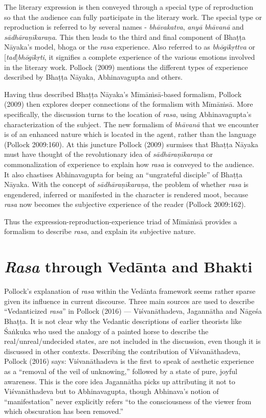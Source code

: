 \newpage

The literary expression is then conveyed through a special type of reproduction so that the audience can fully participate in the literary work. The special type or reproduction is referred to by several names - \textsl{bhāvakatva}, \textsl{anyā} \textsl{bhāvanā} and \textsl{sādhāraṇīkaraṇa}. This then leads to the third and final component of Bhaṭṭa Nāyaka’s model, bhoga or the \textsl{rasa} experience. Also referred to as \textsl{bhōgīkṛttva} or [\textsl{tad}]\textsl{bhōgīkṛti}, it signifies a complete experience of the various emotions involved in the literary work. Pollock (2009) mentions the different types of experience described by Bhaṭṭa Nāyaka, Abhinavagupta and others. 

Having thus described Bhaṭṭa Nāyaka’s Mīmāṁsā-based formalism, Pollock (2009) then explores deeper connections of the formalism with Mīmāṁsā. More specifically, the discussion turns to the location of \textsl{rasa}, using Abhinavagupta’s characterization of the subject. The new formalism of \textsl{bhāvanā} that we encounter is of an enhanced nature which is located in the agent, rather than the language (Pollock 2009:160). At this juncture Pollock (2009) surmises that Bhaṭṭa Nāyaka must have thought of the revolutionary idea of \textsl{sādhāraṇīkaraṇa} or commonalization of experience to explain how \textsl{rasa} is conveyed to the audience. It also chastises Abhinavagupta for being an “ungrateful disciple” of Bhaṭṭa Nāyaka. With the concept of \textsl{sādhāraṇīkaraṇa}, the problem of whether \textsl{rasa} is engendered, inferred or manifested in the character is rendered moot, because \textsl{rasa} now becomes the subjective experience of the reader (Pollock 2009:162).

Thus the expression-reproduction-experience triad of Mīmāṁsā provides a formalism to describe \textsl{rasa}, and explain its subjective nature.

\section*{\textsl{Rasa} through Vedānta and Bhakti}

Pollock’s explanation of \textsl{rasa} within the Vedānta framework seems rather sparse given its influence in current discourse. Three main sources are used to describe “Vedanticized \textsl{rasa}” in Pollock (2016) --- Viśvanāthadeva, Jagannātha and Nāgeśa Bhaṭṭa. It is not clear why the Vedantic descriptions of earlier theorists like Śaṅkuka who used the analogy of a painted horse to describe the real/unreal/undecided states, are not included in the discussion, even though it is discussed in other contexts. Describing the contribution of Viśvanāthadeva, Pollock (2016) says: Viśvanāthadeva is the first to speak of aesthetic experience as a “removal of the veil of unknowing,” followed by a state of pure, joyful awareness. This is the core idea Jagannātha picks up attributing it not to Viśvanāthadeva but to Abhinavagupta, though Abhinava’s notion of “manifestation” never explicitly refers “to the consciousness of the viewer from which obscuration has been removed.”

